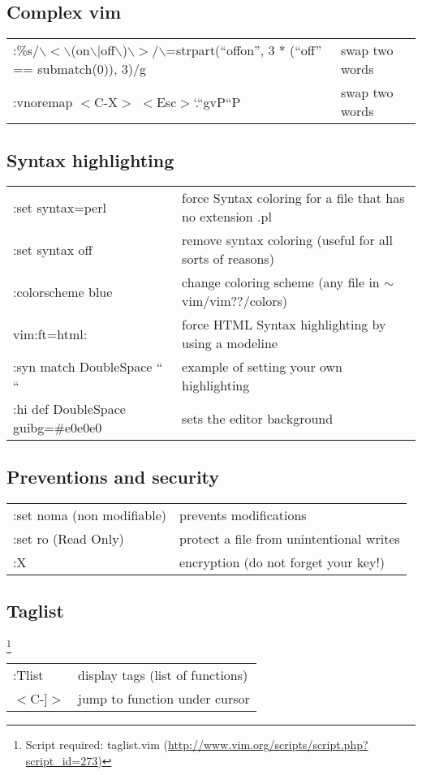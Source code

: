 \documentclass[10pt]{article}
\begin{document}
\subsection{Complex vim}
\begin{center}
\begin{longtable}{l|l}
:\%s/$\backslash$$<$$\backslash$(on$\backslash$$|$off$\backslash$)$\backslash$$>$/$\backslash$=strpart(``offon'', 3 * (``off'' == submatch(0)), 3)/g & swap two words\\
:vnoremap $<$C-X$>$ $<$Esc$>$`.``gvP``P & swap two words
\end{longtable}
\end{center}

\subsection{Syntax highlighting}
\begin{center}
\begin{longtable}{l|l}
 :set syntax=perl & force Syntax coloring for a file that has no extension .pl\\
 :set syntax off & remove syntax coloring (useful for all sorts of reasons)\\
 :colorscheme blue & change coloring scheme (any file in $\sim$vim/vim??/colors)\\
 vim:ft=html: & force HTML Syntax highlighting by using a modeline\\
 :syn match DoubleSpace `` `` & example of setting your own highlighting\\
 :hi def DoubleSpace guibg=\#e0e0e0 & sets the editor background
\end{longtable}
\end{center}

\subsection{Preventions and security}
\begin{center}
\begin{longtable}{l|l}
 :set noma (non modifiable) & prevents modifications\\
 :set ro (Read Only) & protect a file from unintentional writes\\
 :X & encryption (do not forget your key!)
\end{longtable}
\end{center}

\subsection{Taglist}
\footnote{Script required: taglist.vim (\url{http://www.vim.org/scripts/script.php?script_id=273)}}
\begin{center}
\begin{longtable}{l|l}
:Tlist & display tags (list of functions)\\
$<$C-]$>$  & jump to function under cursor
\end{longtable}
\end{center}
\end{document}
